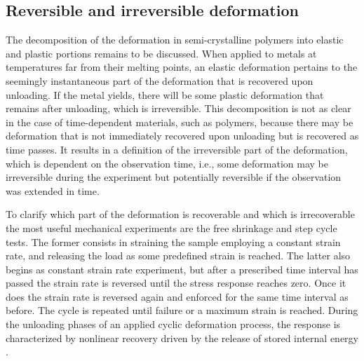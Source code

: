 

\subsection{Reversible and irreversible deformation}
\label{sec:reversible_and_irreversible_deformation}

The decomposition of the deformation in semi-crystalline polymers into elastic and plastic portions remains to be discussed.
When applied to metals at temperatures far from their melting points, an elastic deformation pertains to the seemingly instantaneous part of the deformation that is recovered upon unloading.
If the metal yields, there will be some plastic deformation that remains after unloading, which is irreversible.
This decomposition is not as clear in the case of time-dependent materials, such as polymers, because there may be deformation that is not immediately recovered upon unloading but is recovered as time passes.
It results in a definition of the irreversible part of the deformation, which is dependent on the observation time, i.e., some deformation may be irreversible during the experiment but potentially reversible if the observation was extended in time.

To clarify which part of the deformation is recoverable and which is irrecoverable the most useful mechanical experiments are the free shrinkage and step cycle tests.
The former consists in straining the sample employing a constant strain rate, and releasing the load as some predefined strain is reached.
The latter also begins as constant strain rate experiment, but after a prescribed time interval has passed the strain rate is reversed until the stress response reaches zero.
Once it does the strain rate is reversed again and enforced for the same time interval as before.
The cycle is repeated until failure or a maximum strain is reached.
During the unloading phases of an applied cyclic deformation process, the response is characterized by nonlinear recovery driven by the release of stored internal energy \citep{bergstromConstitutiveModelingUltrahigh2002}.

